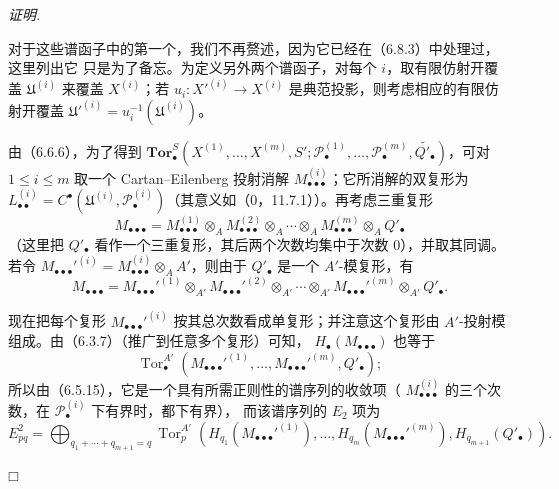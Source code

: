 \documentclass[UTF8,fontset=none,11pt,oneside,openany]{ctexbook}
\providecommand{\square}{\mdlgwhtsquare}
\newenvironment{proof}{%
  \par\smallskip\noindent\textit{证明.}\ %
}{\hfill$\square$\par}
\begin{document}
\begin{proof}
对于这些谱函子中的第一个，我们不再赘述，因为它已经在（6.8.3）中处理过，这里列出它
只是为了备忘。为定义另外两个谱函子，对每个 $i$，取有限仿射开覆盖
$\mathfrak U^{(i)}$ 来覆盖 $X^{(i)}$；若 $u_i:X'^{(i)}\to X^{(i)}$ 是典范投影，则考虑相应的有限仿射开覆盖
$\mathfrak U'^{(i)}=u_i^{-1}(\mathfrak U^{(i)})$。

由（6.6.6），为了得到
$\mathbf{Tor}_\bullet^S(X^{(1)},\ldots,X^{(m)},S';
\mathscr P_\bullet^{(1)},\ldots,\mathscr P_\bullet^{(m)},
\widetilde{Q'_\bullet})$，可对 $1\leq i\leq m$ 取一个 Cartan--Eilenberg 投射消解
$M_{\bullet\bullet\bullet}^{(i)}$；它所消解的双复形为
$L_{\bullet\bullet}^{(i)}=C^\bullet(\mathfrak U^{(i)},
\mathscr P_\bullet^{(i)})$（其意义如（0，11.7.1））。再考虑三重复形
\[
  M_{\bullet\bullet\bullet}
  =M_{\bullet\bullet\bullet}^{(1)}\otimes_A
   M_{\bullet\bullet\bullet}^{(2)}\otimes_A\cdots\otimes_A
   M_{\bullet\bullet\bullet}^{(m)}\otimes_A Q'_\bullet
\]
（这里把 $Q'_\bullet$ 看作一个三重复形，其后两个次数均集中于次数 $0$），并取其同调。
若令 $M_{\bullet\bullet\bullet}'^{(i)}=
M_{\bullet\bullet\bullet}^{(i)}\otimes_A A'$，则由于 $Q'_\bullet$ 是一个
$A'$-模复形，有
\[
  M_{\bullet\bullet\bullet}
  =M_{\bullet\bullet\bullet}'^{(1)}\otimes_{A'}
   M_{\bullet\bullet\bullet}'^{(2)}\otimes_{A'}\cdots\otimes_{A'}
   M_{\bullet\bullet\bullet}'^{(m)}\otimes_{A'} Q'_\bullet.
\]

现在把每个复形 $M_{\bullet\bullet\bullet}'^{(i)}$ 按其总次数看成单复形；并注意这个复形由
$A'$-投射模组成。由（6.3.7）（推广到任意多个复形）可知，
$H_\bullet(M_{\bullet\bullet\bullet})$ 也等于
\[
  \operatorname{Tor}_\bullet^{A'}
  (M_{\bullet\bullet\bullet}'^{(1)},\ldots,
   M_{\bullet\bullet\bullet}'^{(m)},Q'_\bullet);
\]
所以由（6.5.15），它是一个具有所需正则性的谱序列的收敛项（
$M_{\bullet\bullet\bullet}^{(i)}$ 的三个次数，在
$\mathscr P_\bullet^{(i)}$ 下有界时，都下有界），
而该谱序列的 $E_2$ 项为
\[
  E_{pq}^2
  =\bigoplus_{q_1+\cdots+q_{m+1}=q}
  \operatorname{Tor}_p^{A'}
  (H_{q_1}(M_{\bullet\bullet\bullet}'^{(1)}),\ldots,
   H_{q_m}(M_{\bullet\bullet\bullet}'^{(m)}),H_{q_{m+1}}(Q'_\bullet)).
\]


\end{proof}
\end{document}
